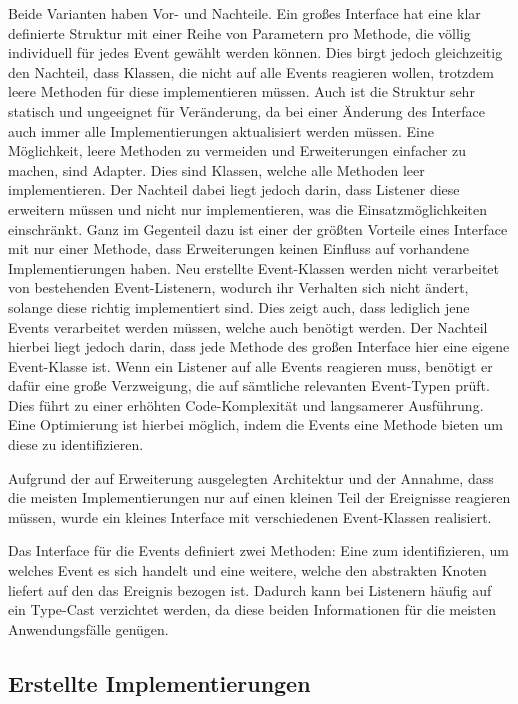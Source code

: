 Beide Varianten haben Vor- und Nachteile.
Ein großes Interface hat eine klar definierte Struktur mit einer Reihe von Parametern pro Methode, die völlig individuell für jedes Event gewählt werden können. Dies birgt jedoch gleichzeitig den Nachteil, dass Klassen, die nicht auf alle Events reagieren wollen, trotzdem leere Methoden für diese implementieren müssen. Auch ist die Struktur sehr statisch und ungeeignet für Veränderung, da bei einer Änderung des Interface auch immer alle Implementierungen aktualisiert werden müssen. Eine Möglichkeit, leere Methoden zu vermeiden und Erweiterungen einfacher zu machen, sind Adapter. Dies sind Klassen, welche alle Methoden leer implementieren. Der Nachteil dabei liegt jedoch darin, dass Listener diese erweitern müssen und nicht nur implementieren, was die Einsatzmöglichkeiten einschränkt.
Ganz im Gegenteil dazu ist einer der größten Vorteile eines Interface mit nur einer Methode, dass Erweiterungen keinen Einfluss auf vorhandene Implementierungen haben. Neu erstellte Event-Klassen werden nicht verarbeitet von bestehenden Event-Listenern, wodurch ihr Verhalten sich nicht ändert, solange diese richtig implementiert sind. Dies zeigt auch, dass lediglich jene Events verarbeitet werden müssen, welche auch benötigt werden. Der Nachteil hierbei liegt jedoch darin, dass jede Methode des großen Interface hier eine eigene Event-Klasse ist. Wenn ein Listener auf alle Events reagieren muss, benötigt er dafür eine große Verzweigung, die auf sämtliche relevanten Event-Typen prüft. Dies führt zu einer erhöhten Code-Komplexität und langsamerer Ausführung. Eine Optimierung ist hierbei möglich, indem die Events eine Methode bieten um diese zu identifizieren.

Aufgrund der auf Erweiterung ausgelegten Architektur und der Annahme, dass die meisten Implementierungen nur auf einen kleinen Teil der Ereignisse reagieren müssen, wurde ein kleines Interface mit verschiedenen Event-Klassen realisiert.

Das Interface für die Events  definiert zwei Methoden: Eine zum identifizieren, um welches Event es sich handelt und eine weitere, welche den abstrakten Knoten liefert auf den das Ereignis bezogen ist. Dadurch kann bei Listenern häufig auf ein Type-Cast verzichtet werden, da diese beiden Informationen für die meisten Anwendungsfälle genügen.

\subsection{Erstellte Implementierungen} 

